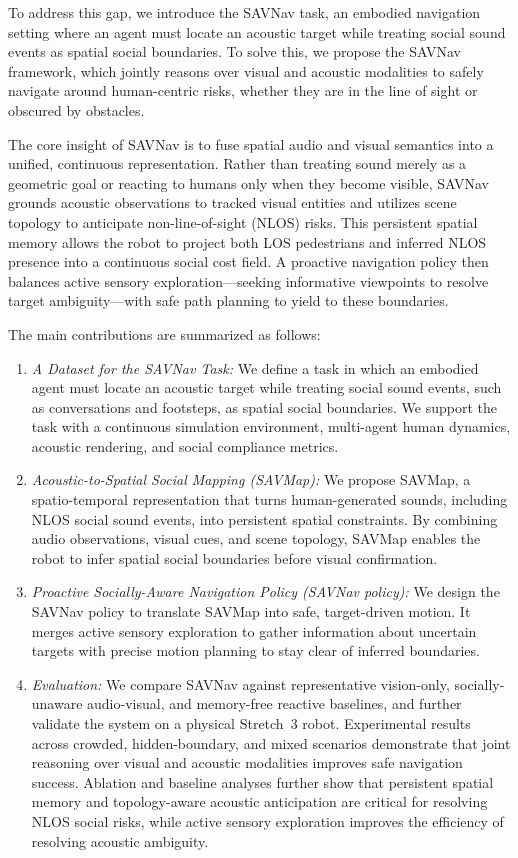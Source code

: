 To address this gap, we introduce the SAVNav task, an embodied navigation setting where an agent must locate an acoustic target while treating social sound events as spatial social boundaries. To solve this, we propose the SAVNav framework, which jointly reasons over visual and acoustic modalities to safely navigate around human-centric risks, whether they are in the line of sight or obscured by obstacles.

The core insight of SAVNav is to fuse spatial audio and visual semantics into a unified, continuous representation. Rather than treating sound merely as a geometric goal or reacting to humans only when they become visible, SAVNav grounds acoustic observations to tracked visual entities and utilizes scene topology to anticipate non-line-of-sight (NLOS) risks. This persistent spatial memory allows the robot to project both LOS pedestrians and inferred NLOS presence into a continuous social cost field. A proactive navigation policy then balances active sensory exploration---seeking informative viewpoints to resolve target ambiguity---with safe path planning to yield to these boundaries.

The main contributions are summarized as follows:
\begin{enumerate}
    \item \textit{A Dataset for the SAVNav Task:} We define a task in which an embodied agent must locate an acoustic target while treating social sound events, such as conversations and footsteps, as spatial social boundaries. We support the task with a continuous simulation environment, multi-agent human dynamics, acoustic rendering, and social compliance metrics.
    \item \textit{Acoustic-to-Spatial Social Mapping (SAVMap):} We propose SAVMap, a spatio-temporal representation that turns human-generated sounds, including NLOS social sound events, into persistent spatial constraints. By combining audio observations, visual cues, and scene topology, SAVMap enables the robot to infer spatial social boundaries before visual confirmation.
    \item \textit{Proactive Socially-Aware Navigation Policy (SAVNav policy):} We design the SAVNav policy to translate SAVMap into safe, target-driven motion. It merges active sensory exploration to gather information about uncertain targets with precise motion planning to stay clear of inferred boundaries.
    \item \textit{Evaluation:} We compare SAVNav against representative vision-only, socially-unaware audio-visual, and memory-free reactive baselines, and further validate the system on a physical Stretch~3 robot. Experimental results across crowded, hidden-boundary, and mixed scenarios demonstrate that joint reasoning over visual and acoustic modalities improves safe navigation success. Ablation and baseline analyses further show that persistent spatial memory and topology-aware acoustic anticipation are critical for resolving NLOS social risks, while active sensory exploration improves the efficiency of resolving acoustic ambiguity.
\end{enumerate}
